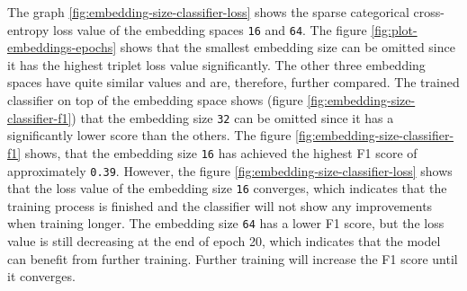 \newline
\newline
The graph \ref{fig:embedding-size-classifier-loss} shows the sparse categorical cross-entropy loss value of the embedding spaces \texttt{16} and \texttt{64}.
\newline
\newline
The figure \ref{fig:plot-embeddings-epochs} shows that the smallest embedding size can be omitted since it has the highest triplet loss value significantly. The other three embedding spaces have quite similar values and are, therefore, further compared. The trained classifier on top of the embedding space shows (figure \ref{fig:embedding-size-classifier-f1}) that the embedding size \texttt{32} can be omitted since it has a significantly lower score than the others. The figure \ref{fig:embedding-size-classifier-f1} shows, that the embedding size \texttt{16} has achieved the highest F1 score of approximately \texttt{0.39}. However, the figure \ref{fig:embedding-size-classifier-loss} shows that the loss value of the embedding size \texttt{16} converges, which indicates that the training process is finished and the classifier will not show any improvements when training longer. The embedding size \texttt{64} has a lower F1 score, but the loss value is still decreasing at the end of epoch 20, which indicates that the model can benefit from further training. Further training will increase the F1 score until it converges.
